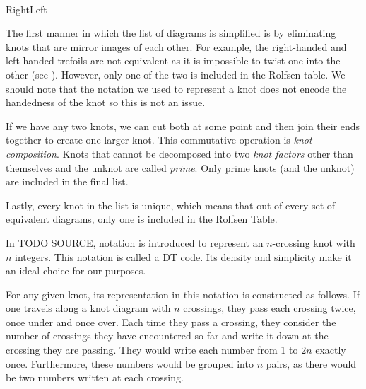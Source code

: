 \begin{paper}
\hfill
{}\\

\hspace{0.05\columnwidth}Right\hspace{0.5\columnwidth}Left\\


The first manner in which the list of diagrams is simplified is by eliminating
knots that are mirror images of each other.
For example, the right-handed and left-handed trefoils are not equivalent as it
is impossible to twist one into the other (see \figTrefoil).
However, only one of the two is included in the Rolfsen table.
We should note that the notation we used to represent a knot does not
encode the handedness of the knot so this is not an issue.

If we have any two knots, we can cut both at some point and then join their ends
together to create one larger knot.
This commutative operation is \textit{knot composition}.
Knots that cannot be decomposed into two \textit{knot factors} other than
themselves and the unknot are called \textit{prime}.
Only prime knots (and the unknot) are included in the final list.

Lastly, every knot in the list is unique, which means that out of every set of
equivalent diagrams, only one is included in the Rolfsen Table.


In TODO SOURCE, notation is introduced to represent an $n$-crossing knot with
$n$ integers.
This notation is called a DT code.
Its density and simplicity make it an ideal choice for our purposes.

For any given knot, its representation in this notation is constructed as
follows.
If one travels along a knot diagram with $n$ crossings, they pass each crossing
twice, once under and once over.
Each time they pass a crossing, they consider the number of crossings they
have encountered so far and write it down at the crossing they are passing.
They would write each number from 1 to $2n$ exactly once.
Furthermore, these numbers would be grouped into $n$ pairs, as there would be
two numbers written at each crossing.


\end{paper}
